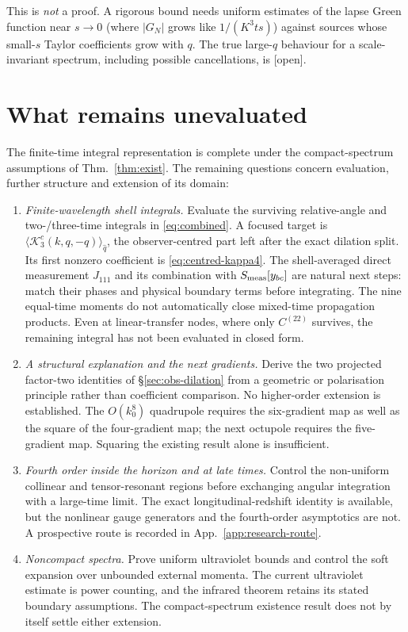 \documentclass[11pt]{article}
\theoremstyle{definition}
\theoremstyle{remark}
\newcommand{\ens}[1]{\langle #1\rangle}
\newcommand{\st}[1]{\textsf{[#1]}}
\begin{document}
This is \emph{not} a proof. A rigorous bound needs uniform estimates of the lapse Green function
near $s\to0$ (where $|G_N|$ grows like $1/(K^3ts)$) against sources whose small-$s$ Taylor
coefficients grow with $q$. The true large-$q$ behaviour for a scale-invariant spectrum,
including possible cancellations, is \st{open}.



\section{What remains unevaluated}\label{sec:open}
The finite-time integral representation is complete under the compact-spectrum assumptions
of Thm.~\ref{thm:exist}. The remaining questions concern evaluation, further structure and
extension of its domain:
\begin{enumerate}
\item \emph{Finite-wavelength shell integrals.} Evaluate the surviving relative-angle and
  two-/three-time integrals in \eqref{eq:combined}. A focused target is
  $\ens{\mathcal K^c_3(k,q,-q)}_{\hat q}$, the observer-centred part left after the exact
  dilation split. Its first nonzero coefficient is \eqref{eq:centred-kappa4}. The
  shell-averaged direct measurement $J_{111}$ and its combination with
  $S_{\rm meas}[y_{bc}]$ are natural next steps: match their phases and physical boundary
  terms before integrating. The nine equal-time moments do not automatically close
  mixed-time propagation products. Even at linear-transfer nodes, where only $C^{(22)}$
  survives, the remaining integral has not been evaluated in closed form.
\item \emph{A structural explanation and the next gradients.} Derive the two projected
  factor-two identities of \S\ref{sec:obs-dilation} from a geometric or polarisation
  principle rather than coefficient comparison. No higher-order extension is established.
  The $O(k_0^8)$ quadrupole requires the six-gradient map as well as the square of the
  four-gradient map; the next octupole requires the five-gradient map. Squaring the
  existing result alone is insufficient.
\item \emph{Fourth order inside the horizon and at late times.} Control the non-uniform
  collinear and tensor-resonant regions before exchanging angular integration with a
  large-time limit. The exact longitudinal-redshift identity is available, but the
  nonlinear gauge generators and the fourth-order asymptotics are not. A prospective
  route is recorded in App.~\ref{app:research-route}.
\item \emph{Noncompact spectra.} Prove uniform ultraviolet bounds and control the soft
  expansion over unbounded external momenta. The current ultraviolet estimate is power
  counting, and the infrared theorem retains its stated boundary assumptions. The
  compact-spectrum existence result does not by itself settle either extension.
\end{enumerate}
\end{document}

